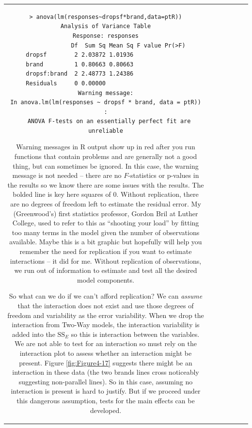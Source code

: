 \documentclass[]{book}
\newenvironment{Shaded}{\begin{snugshade}}{\end{snugshade}}
\theoremstyle{definition}
\theoremstyle{definition}
\theoremstyle{remark}
\begin{document}
\begin{longtable}[]{@{}ccccccc@{}}
\begin{minipage}[b]{0.10\columnwidth}
\begin{Shaded}
\begin{Highlighting}[]
\begin{Shaded}
\begin{Highlighting}[]
\begin{Shaded}
\begin{Highlighting}[]
\begin{Shaded}
\begin{Highlighting}[]
\begin{Shaded}
\begin{Highlighting}[]
\begin{Shaded}
\begin{Highlighting}[]
\begin{Shaded}
\begin{Highlighting}[]
\begin{verbatim}
> anova(lm(responses~dropsf*brand,data=ptR))
Analysis of Variance Table
Response: responses
             Df  Sum Sq Mean Sq F value Pr(>F)
dropsf        2 2.03872 1.01936               
brand         1 0.80663 0.80663               
dropsf:brand  2 2.48773 1.24386               
Residuals     0 0.00000                       
Warning message:
In anova.lm(lm(responses ~ dropsf * brand, data = ptR)) :
  ANOVA F-tests on an essentially perfect fit are unreliable
\end{verbatim}

\normalsize

Warning messages in R output show up in red after you run functions that
contain problems and are generally not a good thing, but can sometimes
be ignored. In this case, the warning message is not needed -- there are
no \(F\)-statistics or p-values in the results so we know there are some
issues with the results. The bolded line is key here squares of 0.
Without replication, there are no degrees of freedom left to estimate
the residual error. My (Greenwood's) first statistics professor, Gordon
Bril at Luther College, used to refer to this as ``shooting your load''
by fitting too many terms in the model given the number of observations
available. Maybe this is a bit graphic but hopefully will help you
remember the need for replication if you want to estimate interactions
-- it did for me. Without replication of observations, we run out of
information to estimate and test all the desired model components.

So what can we do if we can't afford replication? We can \emph{assume}
that the interaction does not exist and use those degrees of freedom and
variability as the error variability. When we drop the interaction from
Two-Way models, the interaction variability is added into the
\(\text{SS}_E\) so this is interaction between the variables. We are not
able to test for an interaction so must rely on the interaction plot to
assess whether an interaction might be present. Figure
\ref{fig:Figure4-17} suggests there might be an interaction in these
data (the two brands lines cross noticeably suggesting non-parallel
lines). So in this case, assuming no interaction is present is hard to
justify. But if we proceed under this dangerous assumption, tests for
the main effects can be developed.


\end{Highlighting}
\end{Shaded}
\end{Highlighting}
\end{Shaded}
\end{Highlighting}
\end{Shaded}
\end{Highlighting}
\end{Shaded}
\end{Highlighting}
\end{Shaded}
\end{Highlighting}
\end{Shaded}
\end{Highlighting}
\end{Shaded}
\end{minipage}
\end{longtable}
\end{document}
